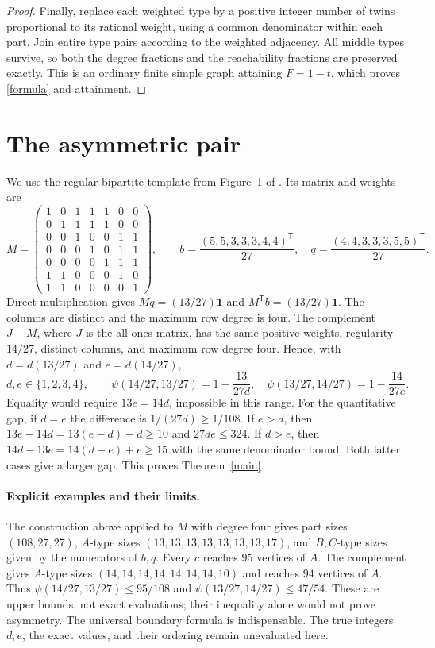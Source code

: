 \documentclass[11pt]{article}
\begin{document}
\begin{proof}
Finally, replace each weighted type by a positive integer number
of twins proportional to its rational weight, using a common
denominator within each part. Join entire type pairs according to
the weighted adjacency. All middle types survive, so both the
degree fractions and the reachability fractions are preserved
exactly. This is an ordinary finite simple graph attaining
$F=1-t$, which proves \eqref{formula} and attainment.
\end{proof}

\section{The asymmetric pair}
We use the regular bipartite template from Figure~1 of
\cite[p.~6; also Section~12, p.~71]{CHSSS}. Its matrix and weights are
\[
 M=\begin{pmatrix}
 1&0&1&1&1&0&0\\
 0&1&1&1&1&0&0\\
 0&0&1&0&0&1&1\\
 0&0&0&1&0&1&1\\
 0&0&0&0&1&1&1\\
 1&1&0&0&0&1&0\\
 1&1&0&0&0&0&1
 \end{pmatrix},\qquad
 b=\frac{(5,5,3,3,3,4,4)^{\mathsf T}}{27},\quad
 q=\frac{(4,4,3,3,3,5,5)^{\mathsf T}}{27}.
\]
Direct multiplication gives
$Mq=(13/27)\mathbf1$ and $M^{\mathsf T}b=(13/27)\mathbf1$.
The columns are distinct and the maximum row degree is four.
The complement $J-M$, where $J$ is the all-ones matrix, has the
same positive weights, regularity $14/27$, distinct columns,
and maximum row degree four. Hence, with
$d=d(13/27)$ and $e=d(14/27)$,
\[
 d,e\in\{1,2,3,4\},\qquad
 \psi(14/27,13/27)=1-\frac{13}{27d},\quad
 \psi(13/27,14/27)=1-\frac{14}{27e}.
\]
Equality would require $13e=14d$, impossible in this range.
For the quantitative gap, if $d=e$ the difference is
$1/(27d)\geq1/108$. If $e>d$, then
$13e-14d=13(e-d)-d\geq10$ and $27de\leq324$.
If $d>e$, then $14d-13e=14(d-e)+e\geq15$ with the same
denominator bound. Both latter cases give a larger gap.
This proves Theorem~\ref{main}.

\paragraph{Explicit examples and their limits.}
The construction above applied to $M$ with degree four gives
part sizes $(108,27,27)$, $A$-type sizes $(13,13,13,13,13,13,13,17)$,
and $B,C$-type sizes given by the numerators of $b,q$.
Every $c$ reaches $95$ vertices of $A$.
The complement gives $A$-type sizes $(14,14,14,14,14,14,14,10)$
and reaches $94$ vertices of $A$.
Thus $\psi(14/27,13/27)\leq95/108$ and
$\psi(13/27,14/27)\leq47/54$.
These are upper bounds, not exact evaluations; their inequality
alone would not prove asymmetry. The universal boundary formula
is indispensable. The true integers $d,e$, the exact values,
and their ordering remain unevaluated here.
\end{document}
